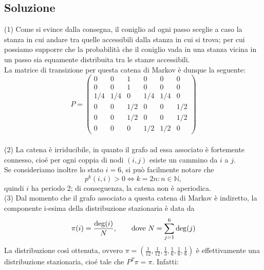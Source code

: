 \documentclass[
	12pt, %
]{fphw}
\begin{document}
\subsection*{Soluzione}
	(1) Come si evince dalla consegna, il coniglio ad ogni passo sceglie a caso la stanza in cui andare tra quelle accessibili dalla stanza in cui si trova; per cui possiamo supporre che la probabilità che il coniglio vada in una stanza vicina in un passo sia equamente distribuita tra le stanze accessibili.\\
	La matrice di transizione per questa catena di Markov è dunque la seguente:
	\begin{equation*}
		P = 
		\begin{pmatrix}
			0 & 0 & 1 & 0 & 0 & 0\\
			0 & 0 & 1 & 0 & 0 & 0\\
			1/4 & 1/4 & 0 & 1/4 & 1/4 & 0\\
			0 & 0 & 1/2 & 0 & 0 & 1/2\\
			0 & 0 & 1/2 & 0 & 0 & 1/2\\
			0 & 0 & 0 & 1/2 & 1/2 & 0
		\end{pmatrix}
	\end{equation*}
	\\
	(2) La catena è irriducibile, in quanto il grafo ad essa associato è fortemente connesso, cioé 
	per ogni coppia di nodi $(i,j)$ esiste un cammino da $i$ a $j$.\\
	Se consideriamo inoltre lo stato $i = 6$, si può facilmente notare che
	\begin{equation*}
		p^{k}(i,i) > 0 \iff k = 2n : n \in \mathbb{N},
	\end{equation*}
	quindi $i$ ha periodo 2; di conseguenza, la catena non è aperiodica.\\
	(3) Dal momento che il grafo associato a questa catena di Markov è indiretto, la componente i-esima della distribuzione stazionaria è data da 
	\begin{equation*}
		\pi(i) = \frac{\deg(i)}{N}, \qquad\textnormal{dove }N = \sum_{j=1}^6 \deg(j)
	\end{equation*}
	La distribuzione così ottenuta, ovvero $\pi = (\frac{1}{12}, \frac{1}{12}, \frac{1}{3}, \frac{1}{6}, \frac{1}{6}, \frac{1}{6})$ è effettivamente una distribuzione stazionaria, cioé tale che $P^T \pi = \pi$. Infatti:
\end{document}

